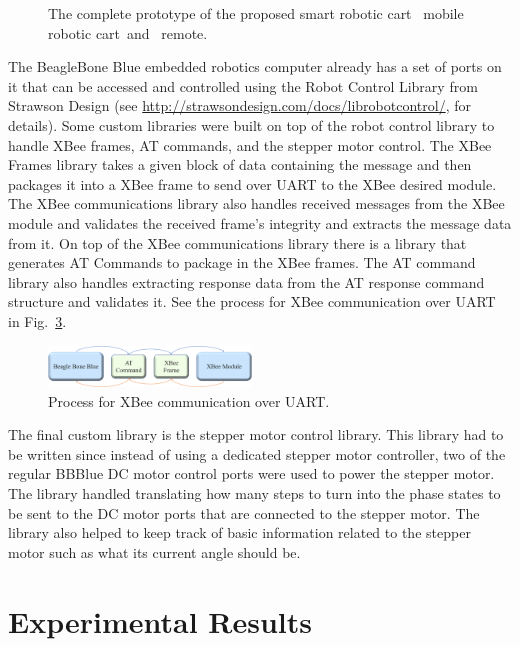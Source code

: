 \documentclass[conference]{IEEEtran}
\begin{document}
\begin{figure}[htbp]
\begin{subfigure}[b]{0.4\linewidth}
        \caption{}
        \label{fig:remotePrototype}
    \end{subfigure}
    \caption{The complete prototype of the proposed smart robotic cart~ mobile robotic cart~and~ remote.}
    \label{fig:finishedPrototypes}
\end{figure}
%
The BeagleBone Blue embedded robotics computer already has a set of ports on it
that can be accessed and controlled using the Robot Control Library from
Strawson Design (see
\href{http://strawsondesign.com/docs/librobotcontrol/}{http://strawsondesign.com/docs/librobotcontrol/},
for details). Some custom libraries were built on top of the robot control
library to handle XBee frames, AT commands, and the stepper motor control. The
XBee Frames library takes a given block of data containing the message and then
packages it into a XBee frame to send over UART to the XBee desired module. The
XBee communications library also handles received messages from the XBee module
and validates the received frame's integrity and extracts the message data from
it. On top of the XBee communications library there is a library that generates
AT Commands to package in the XBee frames. The AT command library also handles
extracting response data from the AT response command structure and validates
it. See the process for XBee communication over UART in
Fig.~\ref{fig:CommandProcessDiagram}. %
%
\begin{figure}[htbp]
  \centering
  \includegraphics[width=0.48\textwidth]{figs/img/Command Process Diagram.png}
  \caption{Process for XBee communication over UART.}
  \label{fig:CommandProcessDiagram}
\end{figure}
%
The final custom library is the stepper motor control library. This library had
to be written since instead of using a dedicated stepper motor controller, two
of the regular BBBlue DC motor control ports were used to power the stepper
motor. The library handled translating how many steps to turn into the phase
states to be sent to the DC motor ports that are connected to the stepper motor.
The library also helped to keep track of basic information related to the
stepper motor such as what its current angle should be.

\section{Experimental Results}
\label{sec:Experimental Results}
\end{document}

